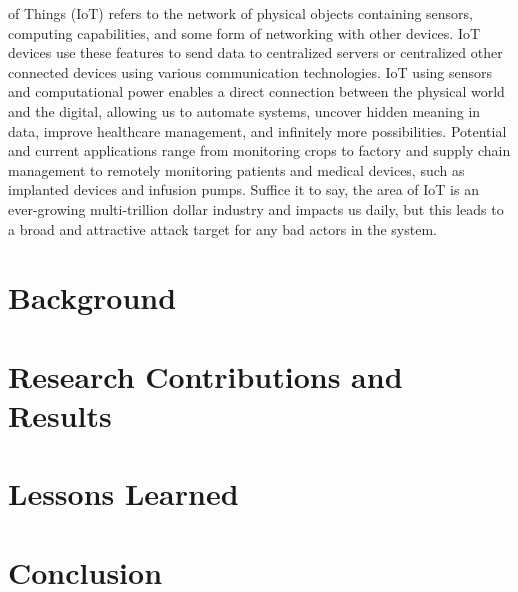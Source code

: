 \documentclass[journal,onecolumn]{IEEEtran}
\begin{document}
 of Things (IoT) refers to the network of physical objects containing sensors, computing capabilities, and some form of networking with other devices. IoT devices use these features to send data to centralized servers or centralized other connected devices using various communication technologies. IoT using sensors and computational power enables a direct connection between the physical world and the digital, allowing us to automate systems, uncover hidden meaning in data, improve healthcare management, and infinitely more possibilities. Potential and current applications range from monitoring crops to factory and supply chain management to remotely monitoring patients and medical devices, such as implanted devices and infusion pumps. Suffice it to say, the area of IoT is an ever-growing multi-trillion dollar industry and impacts us daily, but this leads to a broad and attractive attack target for any bad actors in the system. 

\section{Background}



\section{Research Contributions and Results}

\section{Lessons Learned}

\section{Conclusion}


\end{document}
